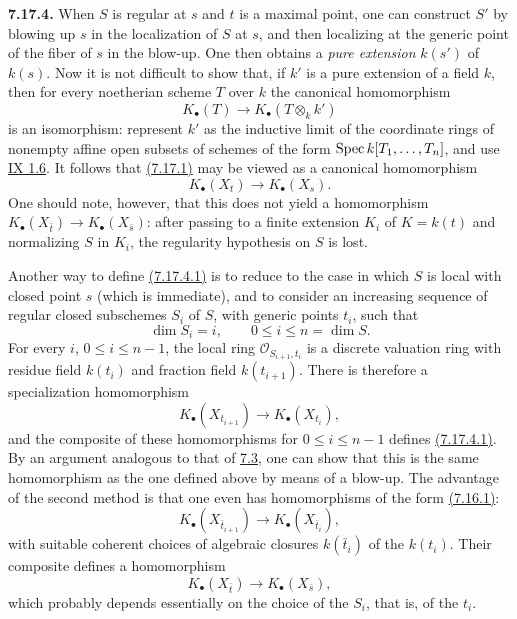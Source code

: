 \textbf{7.17.4.}
When $S$ is regular at $s$ and $t$ is a maximal point, one can construct
$S'$ by
blowing up $s$ in the localization of $S$ at $s$, and then localizing at the
generic point of the fiber of $s$ in the blow-up. One then obtains a
\emph{pure extension} $k(s')$ of $k(s)$. Now it is not difficult to show
that, if $k'$ is a pure extension of a field $k$, then for every noetherian
scheme $T$ over $k$ the canonical homomorphism
\[
K_\bullet(T)\longrightarrow K_\bullet(T\otimes_k k')
\]
is an isomorphism: represent $k'$ as the inductive limit of the coordinate
rings of nonempty affine open subsets of schemes of the form
$\operatorname{Spec} k[T_1,\ldots,T_n]$, and use \hyperlink{sga6.e09.prop.1-6}{IX 1.6}. It follows that \hyperlink{sga6.e10.eq.7-17-1}{(7.17.1)} may be
viewed as a canonical homomorphism
\begin{equation}\tag{7.17.4.1}
K_\bullet(X_t)\longrightarrow K_\bullet(X_s).
\end{equation}
One should note, however, that this does not yield a homomorphism
$K_\bullet(X_{\bar t})\to K_\bullet(X_{\bar s})$: after passing to a finite
extension $K_i$ of $K=k(t)$ and normalizing $S$ in $K_i$, the regularity
hypothesis on $S$ is lost.

Another way to define \hyperlink{sga6.e10.eq.7-17-4-1}{(7.17.4.1)} is to reduce to the case in which $S$ is
local with closed point $s$ (which is immediate), and to consider an
increasing sequence of regular closed subschemes $S_i$ of $S$, with generic
points $t_i$, such that
\[
\dim S_i=i,\qquad 0\leq i\leq n=\dim S.
\]
For every $i$, $0\leq i\leq n-1$, the local ring
$\mathcal O_{S_{i+1},t_i}$ is a discrete valuation ring with residue field
$k(t_i)$ and fraction field $k(t_{i+1})$. There is therefore a
specialization homomorphism
\[
K_\bullet(X_{t_{i+1}})\longrightarrow K_\bullet(X_{t_i}),
\]
and the composite of these homomorphisms for $0\leq i\leq n-1$ defines
\hyperlink{sga6.e10.eq.7-17-4-1}{(7.17.4.1)}. By an argument analogous to that of \hyperlink{sga6.e10.prop.7-3}{7.3}, one can show that this
is the same homomorphism as the one defined above by means of a blow-up. The
advantage of the second method is that one even has homomorphisms of the
form \hyperlink{sga6.e10.eq.7-16-1}{(7.16.1)}:
\[
K_\bullet(X_{\bar t_{i+1}})\longrightarrow
K_\bullet(X_{\bar t_i}),
\]
with suitable coherent choices of algebraic closures $k(\bar t_i)$ of the
$k(t_i)$. Their composite defines a homomorphism
\begin{equation}\tag{7.17.4.2}
K_\bullet(X_{\bar t})\longrightarrow K_\bullet(X_{\bar s}),
\end{equation}
which probably depends essentially on the choice of the $S_i$, that is, of
the $t_i$.

